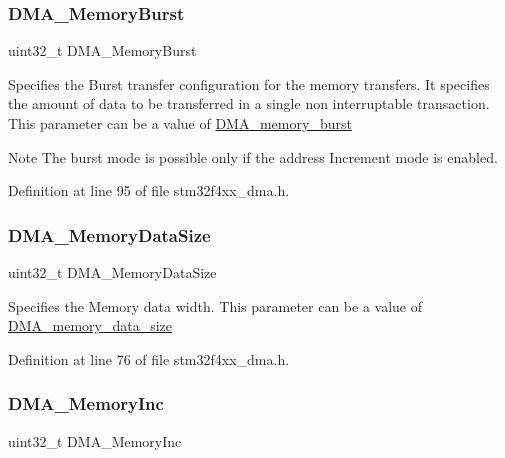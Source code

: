 \subsubsection{\texorpdfstring{D\+M\+A\+\_\+\+Memory\+Burst}{DMA\_MemoryBurst}}
{\footnotesize\ttfamily uint32\+\_\+t D\+M\+A\+\_\+\+Memory\+Burst}

Specifies the Burst transfer configuration for the memory transfers. It specifies the amount of data to be transferred in a single non interruptable transaction. This parameter can be a value of \hyperlink{group___d_m_a__memory__burst}{D\+M\+A\+\_\+memory\+\_\+burst} \begin{DoxyNote}{Note}
The burst mode is possible only if the address Increment mode is enabled. 
\end{DoxyNote}


Definition at line 95 of file stm32f4xx\+\_\+dma.\+h.

\mbox{\label{struct_d_m_a___init_type_def_a7ec1648d136d31d6c504565bf6949eb6}} 
\subsubsection{\texorpdfstring{D\+M\+A\+\_\+\+Memory\+Data\+Size}{DMA\_MemoryDataSize}}
{\footnotesize\ttfamily uint32\+\_\+t D\+M\+A\+\_\+\+Memory\+Data\+Size}

Specifies the Memory data width. This parameter can be a value of \hyperlink{group___d_m_a__memory__data__size}{D\+M\+A\+\_\+memory\+\_\+data\+\_\+size} 

Definition at line 76 of file stm32f4xx\+\_\+dma.\+h.

\mbox{\label{struct_d_m_a___init_type_def_ad8f8a0f3ba4db5d79fd78d02093e4eb9}} 
\subsubsection{\texorpdfstring{D\+M\+A\+\_\+\+Memory\+Inc}{DMA\_MemoryInc}}
{\footnotesize\ttfamily uint32\+\_\+t D\+M\+A\+\_\+\+Memory\+Inc}

